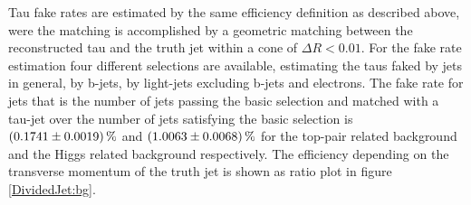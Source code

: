 %
Tau fake rates are estimated by the same efficiency definition as described above, were the matching is accomplished by a geometric matching between the reconstructed tau and the truth jet within a cone of $\Delta R<0.01$. For the fake rate estimation four different selections are available, estimating the taus faked by jets in general, by b-jets, by light-jets excluding b-jets and electrons. The fake rate for jets that is the number of jets passing the basic selection and matched with a tau-jet over the number of jets satisfying the basic selection is $\SI{0.1741\pm 0.0019}{\percent}$ and $\SI{1.0063\pm 0.0068}{\percent}$ for the top-pair related background and the Higgs related background respectively.\newline
The efficiency depending on the transverse momentum of the truth jet is shown as ratio plot in figure \ref{DividedJet:bg}.
%

